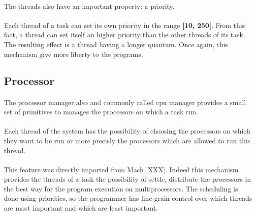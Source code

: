 \documentclass[10pt,a4wide]{article}
\begin{document}
\begin{multicols}{2}
\paragraph{}

The threads also have an important property: a priority.

\paragraph{}

Each thread of a task can set its own priority in the range \textbf{[10, 250[}.
From this fact, a thread can set itself an higher priority than the other
threads of its task. The resulting effect is a thread having a longer quantum.
Once again, this mechanism give more liberty to the programs.

\subsection{Processor}

\paragraph{}

The processor manager also and commonly called cpu manager provides a small
set of primitives to manages the processors on which a task run.

\paragraph{}

Each thread of the system has the possibility of choosing the processors
on which they want to be run or more precisly the processors which are allowed
to run this thread.

\paragraph{}

This feature was directly imported from Mach [XXX]. Indeed this mechanism
provides the threads of a task the possibility of settle, distribute
the processors in the best way for the program execution on multiprocessors.
The scheduling is done using priorities, so the programmer has fine-grain
control over which threads are most important and which are least important.

\paragraph{}


\end{multicols}
\end{document}

